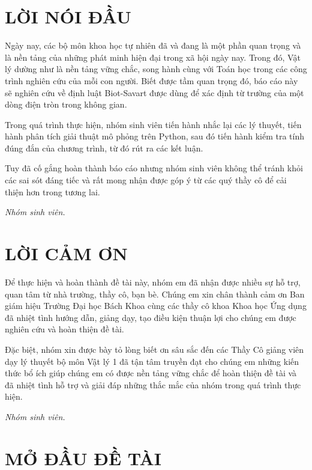 \documentclass{report}
\newcounter{line}
\begin{document}
\tableofcontents
\thispagestyle{empty}
\newpage
{}
{}
\listoffigures
\newpage

\chapter*{LỜI NÓI ĐẦU}
\setcounter{page}{1}
\justifying
Ngày nay, các bộ môn khoa học tự nhiên đã và đang là một phần quan trọng và là nền tảng của những phát minh hiện đại trong xã hội ngày nay. Trong đó, Vật lý dường như là nền tảng vững chắc, song hành cùng với Toán học trong các công trình nghiên cứu của mỗi con người. Biết được tầm quan trọng đó, báo cáo này sẽ nghiên cứu về định luật Biot-Savart được dùng để xác định từ trường của một dòng điện tròn trong không gian.

Trong quá trình thực hiện, nhóm sinh viên tiến hành nhắc lại các lý thuyết, tiến hành phân tích giải thuật mô phỏng trên Python, sau đó tiến hành kiểm tra tính đúng đắn của chương trình, từ đó rút ra các kết luận.

Tuy đã cố gắng hoàn thành báo cáo nhưng nhóm sinh viên không thể tránh khỏi các sai sót đáng tiếc và rất mong nhận được góp ý từ các quý thầy cô để cải thiện hơn trong tương lai.

\vspace{1cm}
\hfill \textit{Nhóm sinh viên.}

\chapter*{LỜI CẢM ƠN}
\justifying
Để thực hiện và hoàn thành đề tài này, nhóm em đã nhận được nhiều sự hỗ trợ, quan tâm từ nhà trường, thầy cô, bạn bè. Chúng em xin chân thành cảm ơn Ban giám hiệu Trường Đại học Bách Khoa cùng các thầy cô khoa Khoa học Ứng dụng đã nhiệt tình hướng dẫn, giảng dạy, tạo điều kiện thuận lợi cho chúng em được nghiên cứu và hoàn thiện đề tài.

Đặc biệt, nhóm xin được bày tỏ lòng biết ơn sâu sắc đến các Thầy Cô giảng viên dạy lý thuyết bộ môn Vật lý 1 đã tận tâm truyền đạt cho chúng em những kiến thức bổ ích giúp chúng em có được nền tảng vững chắc để hoàn thiện đề tài và đã nhiệt tình hỗ trợ và giải đáp những thắc mắc của nhóm trong quá trình thực hiện.

\vspace{1cm}
\hfill \textit{Nhóm sinh viên.}

\chapter{MỞ ĐẦU ĐỀ TÀI}
\end{document}
